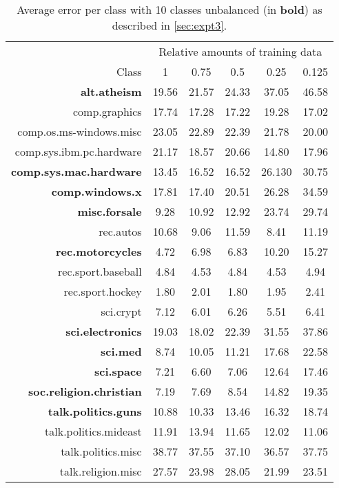 \begin{table}[h]
    \centering
    \begin{tabular}{r||c|c|c|c|c}
    \toprule
    & \multicolumn{5}{c}{Relative amounts of training data} \\
    Class &      1 &      0.75 &      0.5 &      0.25 &      0.125 \\
    \midrule
    \textbf{alt.atheism}            &  19.56 &  21.57 &  24.33 &  37.05 &  46.58 \\
    comp.graphics            &  17.74 &  17.28 &  17.22 &  19.28 &  17.02 \\
    comp.os.ms-windows.misc  &  23.05 &  22.89 &  22.39 &  21.78 &  20.00 \\
    comp.sys.ibm.pc.hardware &  21.17 &  18.57 &  20.66 &  14.80 &  17.96 \\
    \textbf{comp.sys.mac.hardware}    &  13.45 &  16.52 &  16.52 &  26.130 &  30.75 \\
    \textbf{comp.windows.x  }         &  17.81 &  17.40 &  20.51 &  26.28 &  34.59 \\
    \textbf{misc.forsale }            &   9.28 &  10.92 &  12.92 &  23.74 &  29.74 \\
    rec.autos                &  10.68 &   9.06 &  11.59 &   8.41 &  11.19 \\
    \textbf{rec.motorcycles }         &   4.72 &   6.98 &   6.83 &  10.20 &  15.27 \\
    rec.sport.baseball       &   4.84 &   4.53 &   4.84 &   4.53 &   4.94 \\
    \hline
    rec.sport.hockey         &   1.80 &   2.01 &   1.80 &   1.95 &   2.41 \\
    sci.crypt                &   7.12 &   6.01 &   6.26 &   5.51 &   6.41 \\
    \textbf{sci.electronics}          &  19.03 &  18.02 &  22.39 &  31.55 &  37.86 \\
    \textbf{sci.med}                  &   8.74 &  10.05 &  11.21 &  17.68 &  22.58 \\
    \textbf{sci.space}                &   7.21 &   6.60 &   7.06 &  12.64 &  17.46 \\
    \textbf{soc.religion.christian}   &   7.19 &   7.69 &   8.54 &  14.82 &  19.35 \\
    \textbf{talk.politics.guns}       &  10.88 &  10.33 &  13.46 &  16.32 &  18.74 \\
    talk.politics.mideast    &  11.91 &  13.94 &  11.65 &  12.02 &  11.06 \\
    talk.politics.misc       &  38.77 &  37.55 &  37.10 &  36.57 &  37.75 \\
    talk.religion.misc       &  27.57 &  23.98 &  28.05 &  21.99 &  23.51 \\
    \bottomrule
    \end{tabular}
    \caption[Class errors with 10 classes unbalanced]{Average error per class with 10 classes unbalanced (in \textbf{bold}) as described in \cref{sec:expt3}.}
\end{table}{}

